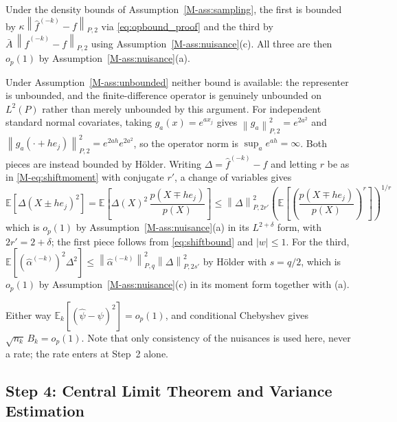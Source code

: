 \documentclass[12pt,a4paper]{article}
\numberwithin{equation}{section}
\theoremstyle{plain}
\theoremstyle{definition}
\newcommand{\norm}[1]{\left\| #1 \right\|}
\newcommand{\E}{\mathbb{E}}
\newcommand{\abs}[1]{\left| #1 \right|}
\newcommand{\Ptwo}[1]{\norm{#1}_{P,2}}
\newcommand{\Pq}[2]{\norm{#1}_{P,#2}}
\begin{document}
	Under the density bounds of Assumption~\ref{M-ass:sampling}, the first is bounded by
	$\kappa \Ptwo{\hat{f}^{(-k)} - f}$ via \eqref{eq:opbound_proof} and the third by
	$\bar{A}\, \Ptwo{\hat{f}^{(-k)} - f}$ using Assumption~\ref{M-ass:nuisance}(c). All
	three are then $o_p(1)$ by Assumption~\ref{M-ass:nuisance}(a).

	Under Assumption~\ref{M-ass:unbounded} neither bound is available: the representer
	is unbounded, and the finite-difference operator is genuinely unbounded on
	$L^2(P)$ rather than merely unbounded by this argument. For independent standard
	normal covariates, taking $g_a(x) = e^{a x_j}$ gives
	$\Ptwo{g_a}^2 = e^{2a^2}$ and $\Ptwo{g_a(\cdot + h e_j)}^2 = e^{2ah}e^{2a^2}$, so
	the operator norm is $\sup_a e^{ah} = \infty$. Both pieces are instead bounded by
	H\"{o}lder. Writing $\Delta = \hat{f}^{(-k)} - f$ and letting $r$ be as in
	\eqref{M-eq:shiftmoment} with conjugate $r'$, a change of variables gives
	\begin{equation}
		\E\left[\Delta(X \pm h e_j)^2\right]
		= \E\left[\Delta(X)^2\, \frac{p(X \mp h e_j)}{p(X)}\right]
		\leq \Pq{\Delta}{2r'}^2
		\left(\E\left[\left(\frac{p(X \mp h e_j)}{p(X)}\right)^{r}\right]\right)^{1/r}
		\label{eq:shiftbound}
	\end{equation}
	which is $o_p(1)$ by Assumption~\ref{M-ass:nuisance}(a) in its $L^{2+\delta}$ form,
	with $2r' = 2 + \delta$; the first piece follows from \eqref{eq:shiftbound} and
	$\abs{w} \leq 1$. For the third,
	$\E[(\hat{\alpha}^{(-k)})^2 \Delta^2]
	\leq \Pq{\hat{\alpha}^{(-k)}}{q}^2 \Pq{\Delta}{2s'}^2$ by H\"{o}lder with
	$s = q/2$, which is $o_p(1)$ by Assumption~\ref{M-ass:nuisance}(c) in its moment
	form together with (a).

	Either way $\E_k[(\hat{\psi} - \psi)^2] = o_p(1)$, and conditional Chebyshev gives
	$\sqrt{n_k}\, B_k = o_p(1)$. Note that only consistency of the nuisances is used
	here, never a rate; the rate enters at Step~2 alone.
	
	\subsection{Step 4: Central Limit Theorem and Variance Estimation}
	
\end{document}
